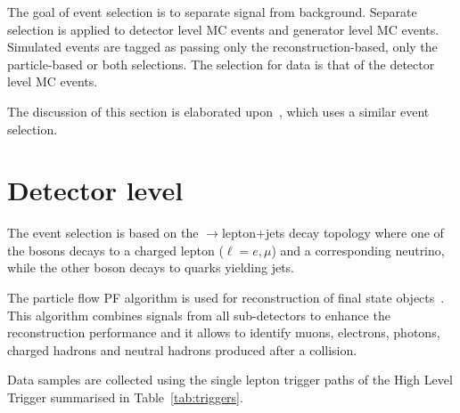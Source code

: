 The goal of event selection is to separate signal from background. Separate selection is applied to detector level MC events and generator level MC events. Simulated events are tagged as passing only the reconstruction-based, only the particle-based or both selections. The selection for data is that of the detector level MC events.

The discussion of this section is elaborated upon~\cite{CMS-AN-2017-159}, which uses a similar event selection.

\section{Detector level}
\label{sec:detector_level}

The event selection is based on the \ttbar$\to$lepton+jets decay topology where one of the \PW bosons decays to a charged lepton ($\ell=e, \mu$) and a corresponding neutrino, while the other \PW boson decays to quarks yielding jets.

The particle flow PF algorithm is used for reconstruction of final state objects~\cite{Sirunyan:2017ulk}. This algorithm combines signals from all sub-detectors to enhance the reconstruction performance and it allows to identify muons, electrons, photons, charged hadrons and neutral hadrons produced after a \Pp\Pp collision.

Data samples are collected using the single lepton trigger paths of the High Level Trigger summarised in Table~\ref{tab:triggers}.

